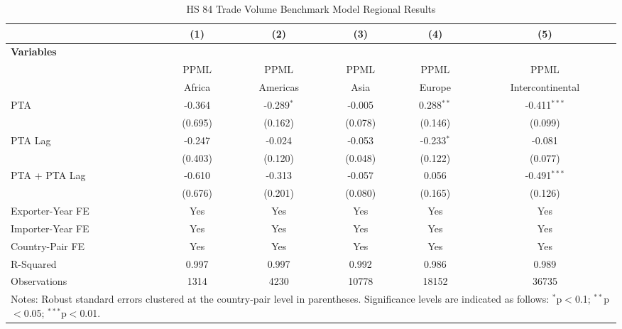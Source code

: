 \begin{table}[htbp]
    \centering
    \caption{HS 84 Trade Volume Benchmark Model Regional Results}
    \label{tab:84_trade_benchmark_region_analysis}
    \begin{adjustbox}{max width=\textwidth}
    \begin{tabular}{l@{\extracolsep{1pt}}ccccc}
    \hline
    & \multicolumn{1}{c}{(1)} & \multicolumn{1}{c}{(2)} & \multicolumn{1}{c}{(3)} & \multicolumn{1}{c}{(4)} & \multicolumn{1}{c}{(5)} \\
    \hline
    \textbf{Variables} &  &  &  &  &  \\
    \hline
     & PPML & PPML & PPML & PPML & PPML \\
     & Africa & Americas & Asia & Europe & Intercontinental \\
    \hline
    PTA & -0.364 & -0.289$^{\ast}$ & -0.005 & 0.288$^{\ast\ast}$ & -0.411$^{\ast\ast\ast}$ \\
    & (0.695) & (0.162) & (0.078) & (0.146) & (0.099) \\

    PTA Lag & -0.247 & -0.024 & -0.053 & -0.233$^{\ast}$ & -0.081 \\
    & (0.403) & (0.120) & (0.048) & (0.122) & (0.077) \\

    PTA + PTA Lag & -0.610 & -0.313 & -0.057 & 0.056 & -0.491$^{\ast\ast\ast}$ \\
    & (0.676) & (0.201) & (0.080) & (0.165) & (0.126) \\
    \hline
    Exporter-Year FE & Yes & Yes & Yes & Yes & Yes \\
    Importer-Year FE & Yes & Yes & Yes & Yes & Yes \\
    Country-Pair FE & Yes & Yes & Yes & Yes & Yes \\
    R-Squared & 0.997 & 0.997 & 0.992 & 0.986 & 0.989 \\
    Observations & 1314 & 4230 & 10778 & 18152 & 36735 \\
    \hline
    \multicolumn{6}{l}{\footnotesize{Notes: Robust standard errors clustered at the country-pair level in parentheses. Significance levels are indicated as follows: $^{\ast}$p$<$0.1; $^{\ast\ast}$p$<$0.05; $^{\ast\ast\ast}$p$<$0.01.}} \\
    \end{tabular}
    \end{adjustbox}
\end{table}
